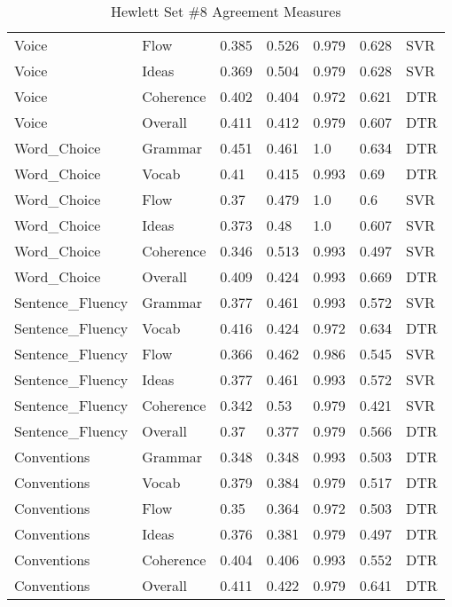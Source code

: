 \begin{table}[h]
\begin{tabular}{lllllll}
Voice               & Flow      & 0.385 & 0.526 & 0.979 & 0.628 & SVR   \\
Voice               & Ideas     & 0.369 & 0.504 & 0.979 & 0.628 & SVR   \\
Voice               & Coherence & 0.402 & 0.404 & 0.972 & 0.621 & DTR   \\
Voice               & Overall   & 0.411 & 0.412 & 0.979 & 0.607 & DTR   \\
Word\_Choice        & Grammar   & 0.451 & 0.461 & 1.0   & 0.634 & DTR   \\
Word\_Choice        & Vocab     & 0.41  & 0.415 & 0.993 & 0.69  & DTR   \\
Word\_Choice        & Flow      & 0.37  & 0.479 & 1.0   & 0.6   & SVR   \\
Word\_Choice        & Ideas     & 0.373 & 0.48  & 1.0   & 0.607 & SVR   \\
Word\_Choice        & Coherence & 0.346 & 0.513 & 0.993 & 0.497 & SVR   \\
Word\_Choice        & Overall   & 0.409 & 0.424 & 0.993 & 0.669 & DTR   \\
Sentence\_Fluency   & Grammar   & 0.377 & 0.461 & 0.993 & 0.572 & SVR   \\
Sentence\_Fluency   & Vocab     & 0.416 & 0.424 & 0.972 & 0.634 & DTR   \\
Sentence\_Fluency   & Flow      & 0.366 & 0.462 & 0.986 & 0.545 & SVR   \\
Sentence\_Fluency   & Ideas     & 0.377 & 0.461 & 0.993 & 0.572 & SVR   \\
Sentence\_Fluency   & Coherence & 0.342 & 0.53  & 0.979 & 0.421 & SVR   \\
Sentence\_Fluency   & Overall   & 0.37  & 0.377 & 0.979 & 0.566 & DTR   \\
Conventions         & Grammar   & 0.348 & 0.348 & 0.993 & 0.503 & DTR   \\
Conventions         & Vocab     & 0.379 & 0.384 & 0.979 & 0.517 & DTR   \\
Conventions         & Flow      & 0.35  & 0.364 & 0.972 & 0.503 & DTR   \\
Conventions         & Ideas     & 0.376 & 0.381 & 0.979 & 0.497 & DTR   \\
Conventions         & Coherence & 0.404 & 0.406 & 0.993 & 0.552 & DTR   \\
Conventions         & Overall   & 0.411 & 0.422 & 0.979 & 0.641 & DTR  \\ \bottomrule
\end{tabular}
\caption{Hewlett Set \#8 Agreement Measures}
\end{table}






